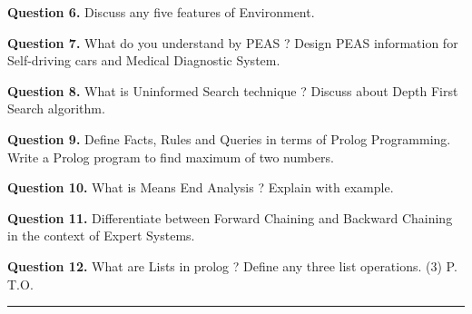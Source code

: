 \documentclass[11pt,a4paper]{article}
\begin{document}
\medskip\noindent\textbf{Question 6.} Discuss any five features of Environment.

\medskip\noindent\textbf{Question 7.} What do you understand by PEAS ? Design PEAS
information for Self-driving cars and Medical
Diagnostic System.

\medskip\noindent\textbf{Question 8.} What is Uninformed Search technique ? Discuss about
Depth First Search algorithm.

\medskip\noindent\textbf{Question 9.} Define Facts, Rules and Queries in terms of Prolog
Programming. Write a Prolog program to find
maximum of two numbers.

\medskip\noindent\textbf{Question 10.} What is Means End Analysis ? Explain with example.

\medskip\noindent\textbf{Question 11.} Differentiate between Forward Chaining and
Backward Chaining in the context of Expert Systems.

\medskip\noindent\textbf{Question 12.} What are Lists in prolog ? Define any three list
operations.
(3) P. T.O.

\bigskip{}
\rule{\linewidth}{0.4pt}\smallskip
\end{document}
